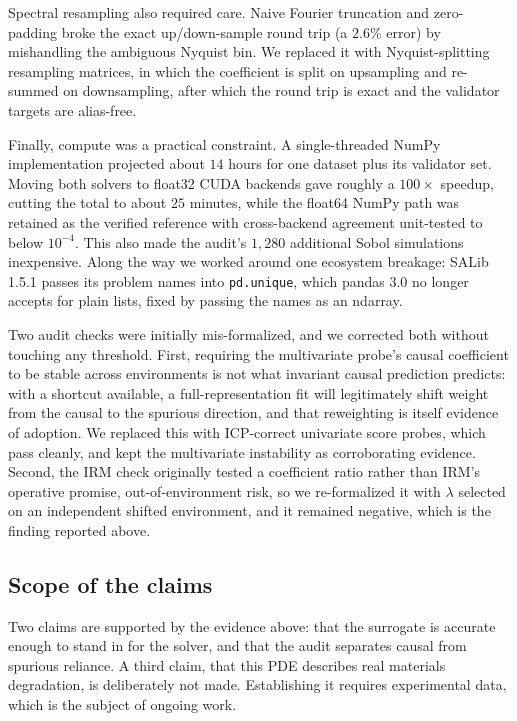 \documentclass[11pt]{article}
\begin{document}
Spectral resampling also required care. Naive Fourier truncation and zero-padding broke the exact
up/down-sample round trip (a $2.6\%$ error) by mishandling the ambiguous Nyquist bin. We replaced it
with Nyquist-splitting resampling matrices, in which the coefficient is split on upsampling and
re-summed on downsampling, after which the round trip is exact and the validator targets are
alias-free.

Finally, compute was a practical constraint. A single-threaded NumPy implementation projected about
$14$ hours for one dataset plus its validator set. Moving both solvers to float32 CUDA backends gave
roughly a $100\times$ speedup, cutting the total to about $25$ minutes, while the float64 NumPy path
was retained as the verified reference with cross-backend agreement unit-tested to below
$10^{-4}$. This also made the audit's $1{,}280$ additional Sobol simulations inexpensive. Along the
way we worked around one ecosystem breakage: SALib 1.5.1 passes its problem names into
\texttt{pd.unique}, which pandas 3.0 no longer accepts for plain lists, fixed by passing the names
as an ndarray.

Two audit checks were initially mis-formalized, and we corrected both without touching any
threshold. First, requiring the multivariate probe's causal coefficient to be stable across
environments is not what invariant causal prediction predicts: with a shortcut available, a
full-representation fit will legitimately shift weight from the causal to the spurious direction,
and that reweighting is itself evidence of adoption. We replaced this with ICP-correct univariate
score probes, which pass cleanly, and kept the multivariate instability as corroborating evidence.
Second, the IRM check originally tested a coefficient ratio rather than IRM's operative promise,
out-of-environment risk, so we re-formalized it with $\lambda$ selected on an independent
shifted environment, and it remained negative, which is the finding reported above.

\subsection{Scope of the claims}

Two claims are supported by the evidence above: that the surrogate is accurate enough to stand in
for the solver, and that the audit separates causal from spurious reliance. A third claim, that this
PDE describes real materials degradation, is deliberately not made. Establishing it requires
experimental data, which is the subject of ongoing work.
\end{document}
